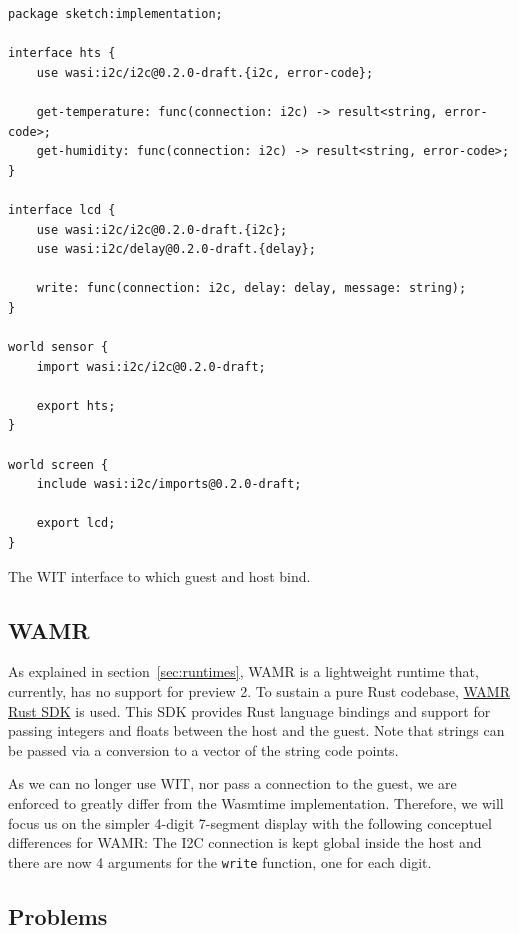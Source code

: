 \begin{listing}[h]
\begin{verbatim}
package sketch:implementation;

interface hts {
    use wasi:i2c/i2c@0.2.0-draft.{i2c, error-code};

    get-temperature: func(connection: i2c) -> result<string, error-code>;
    get-humidity: func(connection: i2c) -> result<string, error-code>;
}

interface lcd {
    use wasi:i2c/i2c@0.2.0-draft.{i2c};
    use wasi:i2c/delay@0.2.0-draft.{delay};

    write: func(connection: i2c, delay: delay, message: string);
}

world sensor {
    import wasi:i2c/i2c@0.2.0-draft;

    export hts;
}

world screen {
    include wasi:i2c/imports@0.2.0-draft;

    export lcd;
}
\end{verbatim}
\caption{The \gls{WIT} interface to which guest and host bind.}
\label{code:wit}
\end{listing}

\subsection{WAMR}
As explained in section~\ref{sec:runtimes}, \gls{WAMR} is a lightweight runtime that, currently, has no support for preview 2. To sustain a pure Rust codebase, \href{https://github.com/bytecodealliance/wamr-rust-sdk}{WAMR Rust SDK} is used. This SDK provides Rust language bindings and support for passing integers and floats between the host and the guest. Note that strings can be passed via a conversion to a vector of the string code points.

As we can no longer use \gls{WIT}, nor pass a connection to the guest, we are enforced to greatly differ from the Wasmtime implementation. Therefore, we will focus us on the simpler 4-digit 7-segment display with the following conceptuel differences for \gls{WAMR}: The \gls{I2C} connection is kept global inside the host and there are now 4 arguments for the \texttt{write} function, one for each digit.

\subsection{Problems}

